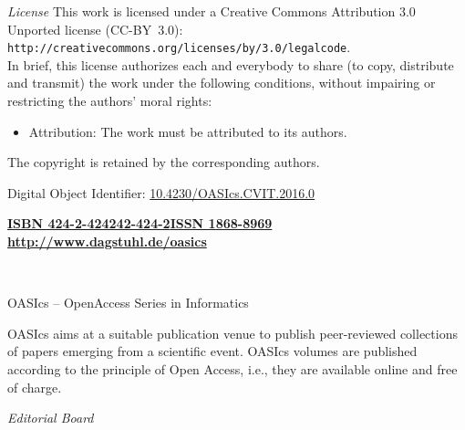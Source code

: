 \documentclass[a4paper,UKenglish]{oasicsmaster-v2016}
\newcommand{\VolumeISBN}{424-2-424242-424-2}
\begin{document}
\begin{publicationinfo}
\bigskip

\emph{License}\newline
This work is licensed under a Creative Commons Attribution 3.0 Unported license (CC-BY~3.0): \texttt{http://creativecommons.org/licenses/by/3.0/legalcode}.\\
In brief, this license authorizes each and everybody to share (to copy, distribute and transmit) the work under the following conditions, without impairing or restricting the authors' moral rights:
\begin{itemize}
\item Attribution: The work must be attributed to its authors.
\end{itemize}

\smallskip

The copyright is retained by the corresponding authors.

\bigskip
\bigskip
\bigskip
\bigskip

Digital Object Identifier: \href{http://dx.doi.org/10.4230/OASIcs.CVIT.2016.0}{10.4230/OASIcs.CVIT.2016.0}

\vfill
\textbf{\href{http://www.dagstuhl.de/dagpub/\VolumeISBN}{ISBN \VolumeISBN}}\qquad \qquad \textbf{\href{http://drops.dagstuhl.de/oasics}{ISSN 1868-8969}}  \hfill \textbf{\href{http://www.dagstuhl.de/oasics}{http://www.dagstuhl.de/oasics}}

  
\newpage

\ \\
\bigskip
\bigskip
\bigskip

{\Large OASIcs -- OpenAccess Series in Informatics}
 
\bigskip
 
OASIcs aims at a suitable publication venue to publish peer-reviewed collections of papers emerging from a scientific event.
OASIcs volumes are published according to the principle of Open Access, i.e., they are available online and free of charge. 
 
\bigskip
\bigskip
\bigskip
 
\emph{Editorial Board}


\end{publicationinfo}
\end{document}
